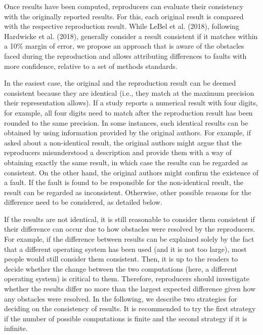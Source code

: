 \documentclass[authordate, meta]{jote-new-article}
\begin{document}
	Once results have been computed, reproducers can evaluate their consistency with the originally reported results. For this, each original result is compared with the respective reproduction result. While LeBel et al. (2018), following Hardwicke et al. (2018), generally consider a result consistent if it matches within a 10\% margin of error, we propose an approach that is aware of the obstacles faced during the reproduction and allows attributing differences to faults with more confidence, relative to a set of methods standards.



	In the easiest case, the original and the reproduction result can be deemed consistent because they are identical (i.e., they match at the maximum precision their representation allows). If a study reports a numerical result with four digits, for example, all four digits need to match after the reproduction result has been rounded to the same precision. In some instances, such identical results can be obtained by using information provided by the original authors. For example, if asked about a non-identical result, the original authors might argue that the reproducers misunderstood a description and provide them with a way of obtaining exactly the same result, in which case the results can be regarded as consistent. On the other hand, the original authors might confirm the existence of a fault. If the fault is found to be responsible for the non-identical result, the result can be regarded as inconsistent. Otherwise, other possible reasons for the difference need to be considered, as detailed below.


	If the results are not identical, it is still reasonable to consider them consistent if their difference can occur due to how obstacles were resolved by the reproducers. For example, if the difference between results can be explained solely by the fact that a different operating system has been used (and it is not too large), most people would still consider them consistent. Then, it is up to the readers to decide whether the change between the two computations (here, a different operating system) is critical to them. Therefore, reproducers should investigate whether the results differ no more than the largest expected difference given how any obstacles were resolved. In the following, we describe two strategies for deciding on the consistency of results. It is recommended to try the first strategy if the number of possible computations is finite and the second strategy if it is infinite.
\end{document}
